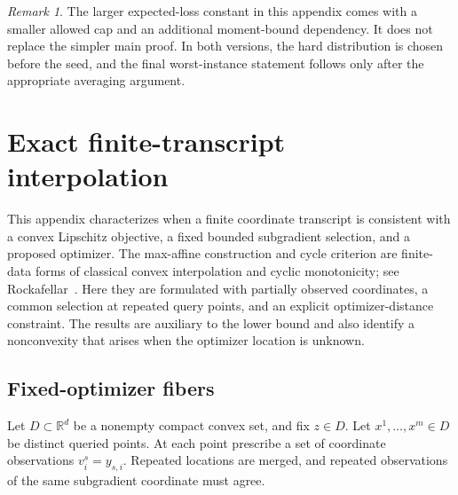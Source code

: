 \documentclass[11pt]{article}
\numberwithin{equation}{section}
\theoremstyle{definition}
\theoremstyle{remark}
\newtheorem{remark}[remark]{Remark}
\newcommand{\R}{\mathbb R}
\begin{document}
\begin{remark}
The larger expected-loss constant in this appendix comes with a smaller allowed cap and an additional moment-bound dependency. It does not replace the simpler main proof. In both versions, the hard distribution is chosen before the seed, and the final worst-instance statement follows only after the appropriate averaging argument.
\end{remark}

\section{Exact finite-transcript interpolation}\label{app:interpolation}

This appendix characterizes when a finite coordinate transcript is consistent with a convex Lipschitz objective, a fixed bounded subgradient selection, and a proposed optimizer. The max-affine construction and cycle criterion are finite-data forms of classical convex interpolation and cyclic monotonicity; see Rockafellar\ \cite[Theorem~1]{Rockafellar1966}. Here they are formulated with partially observed coordinates, a common selection at repeated query points, and an explicit optimizer-distance constraint. The results are auxiliary to the lower bound and also identify a nonconvexity that arises when the optimizer location is unknown.

\subsection{Fixed-optimizer fibers}

Let $D\subset\R^d$ be a nonempty compact convex set, and fix $z\in D$. Let $x^1,\ldots,x^m\in D$ be distinct queried points. At each point prescribe a set of coordinate observations $v_i^s=y_{s,i}$. Repeated locations are merged, and repeated observations of the same subgradient coordinate must agree.
\end{document}
